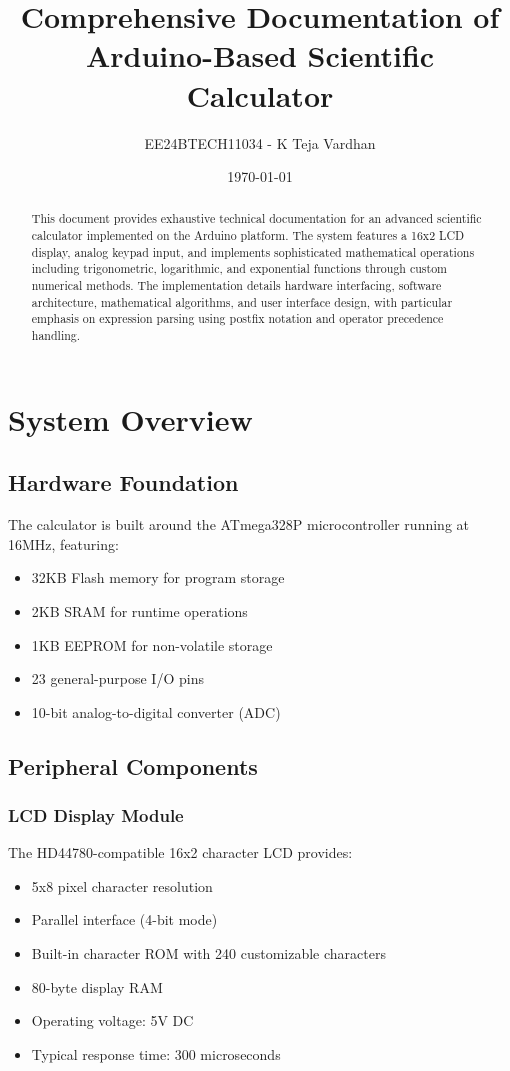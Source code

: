 \documentclass{article}
\title{Comprehensive Documentation of Arduino-Based Scientific Calculator}
\author{EE24BTECH11034 - K Teja Vardhan}
\date{\today}
\begin{document}
\maketitle


\begin{abstract}
This document provides exhaustive technical documentation for an advanced scientific calculator implemented on the Arduino platform. The system features a 16x2 LCD display, analog keypad input, and implements sophisticated mathematical operations including trigonometric, logarithmic, and exponential functions through custom numerical methods. The implementation details hardware interfacing, software architecture, mathematical algorithms, and user interface design, with particular emphasis on expression parsing using postfix notation and operator precedence handling.
\end{abstract}

\tableofcontents

\section{System Overview}
\subsection{Hardware Foundation}

The calculator is built around the ATmega328P microcontroller running at 16MHz, featuring:
\begin{itemize}
\item 32KB Flash memory for program storage
\item 2KB SRAM for runtime operations
\item 1KB EEPROM for non-volatile storage
\item 23 general-purpose I/O pins
\item 10-bit analog-to-digital converter (ADC)
\end{itemize}

\subsection{Peripheral Components}

\subsubsection{LCD Display Module}
The HD44780-compatible 16x2 character LCD provides:
\begin{itemize}
\item 5x8 pixel character resolution
\item Parallel interface (4-bit mode)
\item Built-in character ROM with 240 customizable characters
\item 80-byte display RAM
\item Operating voltage: 5V DC
\item Typical response time: 300 microseconds
\end{itemize}
\end{document}
